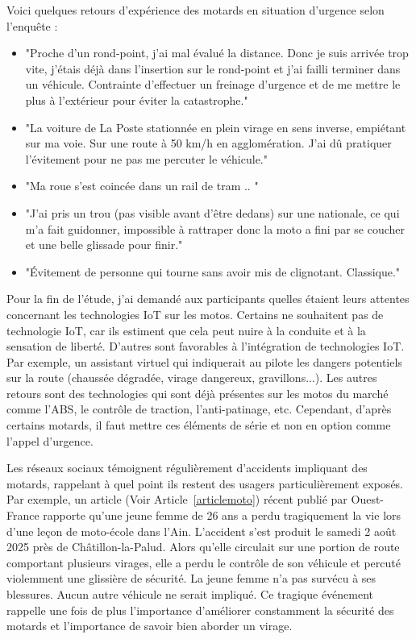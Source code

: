Voici quelques retours d'expérience des motards en situation d'urgence selon l'enquête :\\
\begin{itemize}
  \item "Proche d'un rond-point, j'ai mal évalué la distance. Donc je suis arrivée trop vite, j'étais déjà dans l'insertion sur le rond-point et j'ai failli terminer dans un véhicule. Contrainte d'effectuer un freinage d'urgence et de me mettre le plus à l'extérieur pour éviter la catastrophe."
  \item "La voiture de La Poste stationnée en plein virage en sens inverse, empiétant sur ma voie. Sur une route à 50 km/h en agglomération. J'ai dû pratiquer l'évitement pour ne pas me percuter le véhicule."
  \item "Ma roue s’est coincée dans un rail de tram .. "
  \item "J'ai pris un trou (pas visible avant d'être dedans) sur une nationale, ce qui m'a fait guidonner, impossible à rattraper donc la moto a fini par se coucher et une belle glissade pour finir."
  \item "Évitement de personne qui tourne sans avoir mis de clignotant. Classique."
\end{itemize}
\vspace{0.5cm}

Pour la fin de l'étude, j'ai demandé aux participants quelles étaient leurs attentes concernant les technologies IoT sur les motos. Certains ne souhaitent pas de technologie IoT, car ils estiment que cela peut nuire à la conduite et à la sensation de liberté. D'autres sont favorables à l'intégration de technologies IoT. Par exemple, un assistant virtuel qui indiquerait au pilote les dangers potentiels sur la route (chaussée dégradée, virage dangereux, gravillons...). Les autres retours sont des technologies qui sont déjà présentes sur les motos du marché comme l'ABS, le contrôle de traction, l'anti-patinage, etc. Cependant, d'après certains motards, il faut mettre ces éléments de série et non en option comme l'appel d'urgence.
\vspace{0.5cm}

Les réseaux sociaux témoignent régulièrement d’accidents impliquant des motards, rappelant à quel point ils restent des usagers particulièrement exposés. Par exemple, un article (Voir Article~\ref{articlemoto}) récent publié par Ouest-France rapporte qu'une jeune femme de 26 ans a perdu tragiquement la vie lors d'une leçon de moto-école dans l’Ain. L'accident s'est produit le samedi 2 août 2025 près de Châtillon-la-Palud. Alors qu'elle circulait sur une portion de route comportant plusieurs virages, elle a perdu le contrôle de son véhicule et percuté violemment une glissière de sécurité. La jeune femme n’a pas survécu à ses blessures. Aucun autre véhicule ne serait impliqué. Ce tragique événement rappelle une fois de plus l’importance d'améliorer constamment la sécurité des motards et l'importance de savoir bien aborder un virage.
\vspace{0.5cm}

